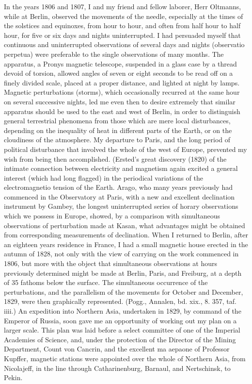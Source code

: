{In the years 1806 and 1807, I and my friend and fellow laborer, Herr Oltmanns, while at Berlin, observed the movements of the needle, especially at the times of the solstices and equinoxes, from hour to hour, and often from half hour to half hour, for five or six days and nights uninterrupted. I had persuaded myself that continuous and uninterrupted observations of several days and nights (observatio perpetua) were preferable to the single observations of many months. The apparatus, a Pronys magnetic telescope, suspended in a glass case by a thread devoid of torsion, allowed angles of seven or eight seconds to be read off on a finely divided scale, placed at a proper distance, and lighted at night by lamps. Magnetic perturbations (storms), which occasionally recurred at the same hour on several successive nights, led me even then to desire extremely that similar apparatus should be used to the east and west of Berlin, in order to distinguish general terrestrial phenomena from those which are mere local disturbances, depending on the inequality of heat in different parts of the Earth, or on the cloudiness of the atmosphere. My departure to Paris, and the long period of political disturbance that involved the whole of the west of Europe, prevented my wish from being then accomplished. (Ersted's great discovery (1820) of the intimate connection between electricity and magnetism again excited a general interest (which had long flagged) in the periodical variations of the electromagnetio tension of the Earth. Arago, who many years previously had commenced in the Observatory at Paris, with a new and excellent declination instrument by Gambey, the longest uninterrupted series of horary observations which we possess in Europe, showed, by a comparison with simultaneous observations of perturbation made at Kasan, what advantages might be obtained from corresponding measurements of declination. When I returned to Berlin, after an eighteen years residence in France, I had a small magnetic house erected in the autumn of 1828, not only with the view of carrying on the work commenced in 1806, but more with the object that simultaneous observations at hours previously determined might be made at Berlin, Paris, and Freiburg, at a depth of 35 fathoms below the surface. The simultaneous occurrence of the perturbations, and the parallelism of the movements for October and December, 1829, were then graphically represented. (Pogg., Annalen, bd. xix., 8. 357, taf. iiii.) An expedition into Northern Asia, undertaken in 1829, by command of the Emperor of Russia, soon gave me an opportunity of working out my plan on a larger scale. This plan was laid before a select committee of one of the Imperial Academies of Science, and, under the protection of the Director of the Mining Department, Count von Cancrin, and the excellent ma aepaone of Professor Kupffer, magnetic stations were appointed over the whole of Northern Asia, from Nicolajeff, in the line through Catharinenburg, Barnaul, and Nertschinsk, to Pekin.

}
